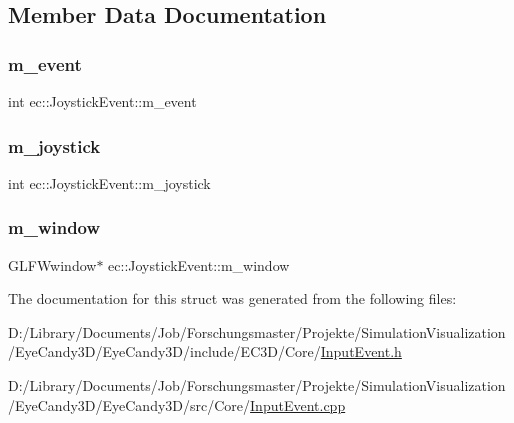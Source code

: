\subsection{Member Data Documentation}
\mbox{\label{structec_1_1_joystick_event_acf4361edcb473cbf0567137224c86f2a}} 
\subsubsection{\texorpdfstring{m\+\_\+event}{m\_event}}
{\footnotesize\ttfamily int ec\+::\+Joystick\+Event\+::m\+\_\+event}

\mbox{\label{structec_1_1_joystick_event_a415b6d2d801b41db8f3dee6b2be35448}} 
\subsubsection{\texorpdfstring{m\+\_\+joystick}{m\_joystick}}
{\footnotesize\ttfamily int ec\+::\+Joystick\+Event\+::m\+\_\+joystick}

\mbox{\label{structec_1_1_joystick_event_a9b108de0a7db9268dd11642a203ef816}} 
\subsubsection{\texorpdfstring{m\+\_\+window}{m\_window}}
{\footnotesize\ttfamily G\+L\+F\+Wwindow$\ast$ ec\+::\+Joystick\+Event\+::m\+\_\+window}



The documentation for this struct was generated from the following files\+:\begin{DoxyCompactItemize}
\item 
D\+:/\+Library/\+Documents/\+Job/\+Forschungsmaster/\+Projekte/\+Simulation\+Visualization/\+Eye\+Candy3\+D/\+Eye\+Candy3\+D/include/\+E\+C3\+D/\+Core/\mbox{\hyperlink{_input_event_8h}{Input\+Event.\+h}}\item 
D\+:/\+Library/\+Documents/\+Job/\+Forschungsmaster/\+Projekte/\+Simulation\+Visualization/\+Eye\+Candy3\+D/\+Eye\+Candy3\+D/src/\+Core/\mbox{\hyperlink{_input_event_8cpp}{Input\+Event.\+cpp}}\end{DoxyCompactItemize}
